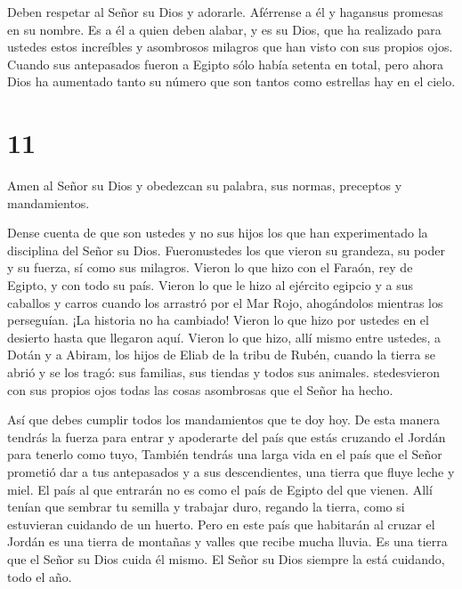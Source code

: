  Deben respetar al Señor su Dios y adorarle. Aférrense a él
y hagansus promesas en su nombre.  Es a él a quien deben
alabar, y es su Dios, que ha realizado para ustedes estos increíbles y
asombrosos milagros que han visto con sus propios ojos. 
Cuando sus antepasados fueron a Egipto sólo había setenta en total, pero
ahora Dios ha aumentado tanto su número que son tantos como estrellas
hay en el cielo.

\hypertarget{section-10}{%
\section{11}\label{section-10}}

 Amen al Señor su Dios y obedezcan su palabra, sus normas,
preceptos y mandamientos.

 Dense cuenta de que son ustedes y no sus hijos los que han
experimentado la disciplina del Señor su Dios. Fueronustedes los que
vieron su grandeza, su poder y su fuerza,  sí como sus
milagros. Vieron lo que hizo con el Faraón, rey de Egipto, y con todo su
país.  Vieron lo que le hizo al ejército egipcio y a sus
caballos y carros cuando los arrastró por el Mar Rojo, ahogándolos
mientras los perseguían. ¡La historia no ha cambiado! 
Vieron lo que hizo por ustedes en el desierto hasta que llegaron aquí.
 Vieron lo que hizo, allí mismo entre ustedes, a Dotán y a
Abiram, los hijos de Eliab de la tribu de Rubén, cuando la tierra se
abrió y se los tragó: sus familias, sus tiendas y todos sus animales.
 stedesvieron con sus propios ojos todas las cosas
asombrosas que el Señor ha hecho.

 Así que debes cumplir todos los mandamientos que te doy
hoy. De esta manera tendrás la fuerza para entrar y apoderarte del país
que estás cruzando el Jordán para tenerlo como tuyo, 
También tendrás una larga vida en el país que el Señor prometió dar a
tus antepasados y a sus descendientes, una tierra que fluye leche y
miel.  El país al que entrarán no es como el país de Egipto
del que vienen. Allí tenían que sembrar tu semilla y trabajar duro,
regando la tierra, como si estuvieran cuidando de un huerto.
 Pero en este país que habitarán al cruzar el Jordán es una
tierra de montañas y valles que recibe mucha lluvia.  Es
una tierra que el Señor su Dios cuida él mismo. El Señor su Dios siempre
la está cuidando, todo el año.

